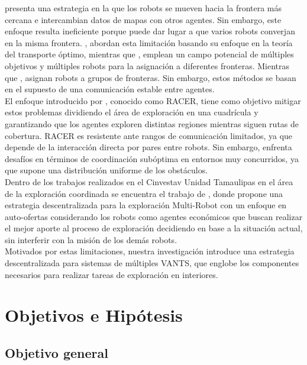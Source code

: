 \documentclass[sigconf]{acmart}
\begin{document}
\citeauthor{YAMAUCHI1997} \cite{YAMAUCHI1997} presenta una estrategia en la que los robots se mueven hacia la frontera más cercana e intercambian datos de mapas con otros agentes. Sin embargo, este enfoque resulta ineficiente porque puede dar lugar a que varios robots converjan en la misma frontera. \citeauthor{9483227} \cite{9483227}, abordan esta limitación basando su enfoque en la teoría del transporte óptimo, mientras que \citeauthor{9561328} \cite{9561328}, emplean un campo potencial de múltiples objetivos y múltiples robots para la asignación a diferentes fronteras. Mientras que \citeauthor{9561226} \cite{9561226}, asignan robots a grupos de fronteras. Sin embargo, estos métodos se basan en el supuesto de una comunicación estable entre agentes.\\

El enfoque introducido por \citeauthor{RACER2022} \cite{RACER2022}, conocido como RACER, tiene como objetivo mitigar estos problemas dividiendo el área de exploración en una cuadrícula y garantizando que los agentes exploren distintas regiones mientras siguen rutas de cobertura. RACER es resistente ante rangos de comunicación limitados, ya que depende de la interacción directa por pares entre robots. Sin embargo, enfrenta desafíos en términos de coordinación subóptima en entornos muy concurridos, ya que supone una distribución uniforme de los obstáculos.\\

Dentro de los trabajos realizados en el Cinvestav Unidad Tamaulipas en el área de la exploración coordinada se encuentra el trabajo de \citeauthor{CINVESTAM2013} \cite{CINVESTAM2013}, donde propone una estrategia descentralizada para la exploración Multi-Robot con un enfoque en auto-ofertas considerando los robots como agentes económicos que buscan realizar el mejor aporte al proceso de exploración decidiendo en base a la situación actual, sin interferir con la misión de los demás robots.\\

Motivados por estas limitaciones, nuestra investigación introduce una estrategia descentralizada para sistemas de múltiples VANTS, que englobe los componentes necesarios para realizar tareas de exploración en interiores.

\section{Objetivos e Hipótesis}

\subsection*{Objetivo general}
\end{document}
